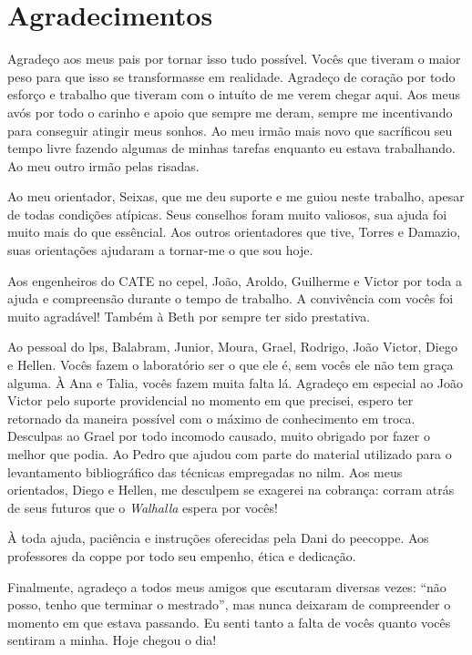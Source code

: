 \chapter*{Agradecimentos}

Agradeço aos meus pais por tornar isso tudo possível. Vocês que
tiveram o maior peso para que isso se transformasse em realidade.
Agradeço de coração por todo esforço e trabalho que tiveram com o
intuíto de me verem chegar aqui. Aos meus avós por todo o carinho e
apoio que sempre me deram, sempre me incentivando para conseguir
atingir meus sonhos. Ao meu irmão mais novo que sacríficou seu tempo
livre fazendo algumas de minhas tarefas enquanto eu estava
trabalhando. Ao meu outro irmão pelas risadas.

Ao meu orientador, Seixas, que me deu suporte e me guiou neste
trabalho, apesar de todas condições atípicas. Seus conselhos foram
muito valiosos, sua ajuda foi muito mais do que essêncial. Aos outros
orientadores que tive, Torres e Damazio, suas orientações ajudaram a
tornar-me o que sou hoje.

Aos engenheiros do CATE no \acl{cepel}, João, Aroldo, Guilherme e
Victor por toda a ajuda e compreensão durante o tempo de trabalho. A
convivência com vocês foi muito agradável! Também à Beth por sempre
ter sido prestativa.

Ao pessoal do \acs{lps}, Balabram, Junior, Moura, Grael, Rodrigo, João
Victor, Diego e Hellen. Vocês fazem o laboratório ser o que ele é, sem
vocês ele não tem graça alguma. À Ana e Talia, vocês fazem muita falta
lá. Agradeço em especial ao João Victor pelo suporte providencial no
momento em que precisei, espero ter retornado da maneira possível com
o máximo de conhecimento em troca. Desculpas ao Grael por todo
incomodo causado, muito obrigado por fazer o melhor que podia. Ao
Pedro que ajudou com parte do material utilizado para o
levantamento bibliográfico das técnicas empregadas no \acs{nilm}.
Aos meus orientados, Diego e Hellen, me desculpem se exagerei na
cobrança: corram atrás de seus futuros que o \emph{Walhalla} espera
por vocês!

À toda ajuda, paciência e instruções oferecidas pela Dani do
\acs{peecoppe}. Aos professores da \acs{coppe} por todo seu
empenho, ética e dedicação.

Finalmente, agradeço a todos meus amigos que escutaram diversas vezes:
``não posso, tenho que terminar o mestrado'', mas nunca deixaram de
compreender o momento em que estava passando. Eu senti tanto a falta
de vocês quanto vocês sentiram a minha. Hoje chegou o dia!

